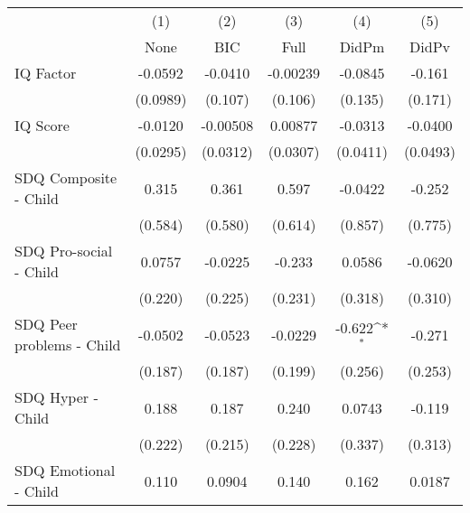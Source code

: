 {
\def\sym#1{\ifmmode^{#1}\else\(^{#1}\)\fi}
\begin{tabular}{l*{5}{c}}
\toprule
            &\multicolumn{1}{c}{(1)}&\multicolumn{1}{c}{(2)}&\multicolumn{1}{c}{(3)}&\multicolumn{1}{c}{(4)}&\multicolumn{1}{c}{(5)}\\
            &\multicolumn{1}{c}{None}&\multicolumn{1}{c}{BIC}&\multicolumn{1}{c}{Full}&\multicolumn{1}{c}{DidPm}&\multicolumn{1}{c}{DidPv}\\
\midrule
IQ Factor   &     -0.0592         &     -0.0410         &    -0.00239         &     -0.0845         &      -0.161         \\
            &    (0.0989)         &     (0.107)         &     (0.106)         &     (0.135)         &     (0.171)         \\
\addlinespace
IQ Score    &     -0.0120         &    -0.00508         &     0.00877         &     -0.0313         &     -0.0400         \\
            &    (0.0295)         &    (0.0312)         &    (0.0307)         &    (0.0411)         &    (0.0493)         \\
\addlinespace
SDQ Composite - Child&       0.315         &       0.361         &       0.597         &     -0.0422         &      -0.252         \\
            &     (0.584)         &     (0.580)         &     (0.614)         &     (0.857)         &     (0.775)         \\
\addlinespace
SDQ Pro-social - Child&      0.0757         &     -0.0225         &      -0.233         &      0.0586         &     -0.0620         \\
            &     (0.220)         &     (0.225)         &     (0.231)         &     (0.318)         &     (0.310)         \\
\addlinespace
SDQ Peer problems - Child&     -0.0502         &     -0.0523         &     -0.0229         &      -0.622\sym{*}  &      -0.271         \\
            &     (0.187)         &     (0.187)         &     (0.199)         &     (0.256)         &     (0.253)         \\
\addlinespace
SDQ Hyper - Child&       0.188         &       0.187         &       0.240         &      0.0743         &      -0.119         \\
            &     (0.222)         &     (0.215)         &     (0.228)         &     (0.337)         &     (0.313)         \\
\addlinespace
SDQ Emotional - Child&       0.110         &      0.0904         &       0.140         &       0.162         &      0.0187         \\

\end{tabular}}
